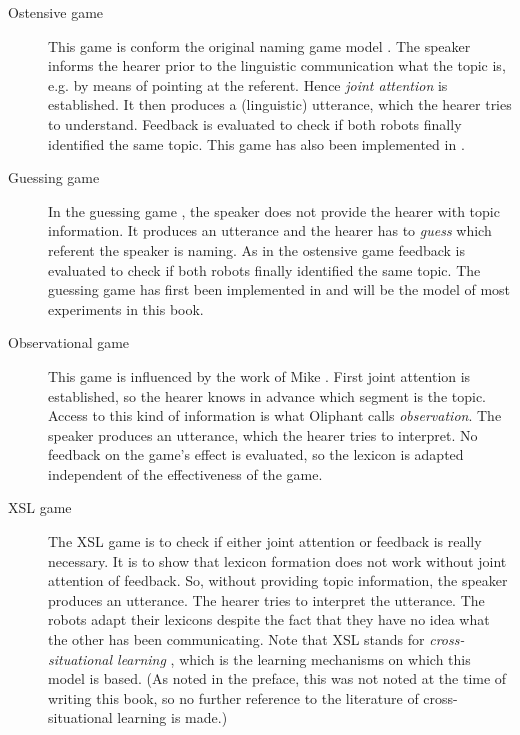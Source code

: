 \begin{description}
\item[Ostensive game] This game is conform the original naming game model \citep{steels:1996a}. The speaker informs the hearer prior to the linguistic communication what the topic is, e.g. by means of pointing at the referent. Hence {\em joint attention} is established. It then produces a (linguistic) utterance, which the hearer tries to understand. Feedback is evaluated to check if both robots finally identified the same topic. This game has also been implemented in \citet{steelsvogt:1997}.

\item[Guessing game] In the guessing game \citep{steelskaplan:1999}, the speaker does not provide the hearer with topic information. It produces an utterance and the hearer has to {\em guess} which referent the speaker is naming. As in the ostensive game feedback is evaluated to check if both robots finally identified the same topic. The guessing game has first been implemented in \citealt{vogt:1998c} and will be the model of most experiments in this book.

\item[Observational game] This game is influenced by the work of Mike \citet{oliphant:1997}. First joint attention is established, so the hearer knows in advance which segment is the topic. Access to this kind of information is what Oliphant calls {\em observation}. The speaker produces an utterance, which the hearer tries to interpret. No feedback on the game's effect is evaluated, so the lexicon is adapted independent of the effectiveness of the game.

\item[XSL game] The XSL game is to check if either joint attention or feedback is really necessary. It is to show that lexicon formation does not work without joint attention of feedback. So, without providing topic information, the speaker produces an utterance. The hearer tries to interpret the utterance. The robots adapt their lexicons despite the fact that they have no idea what the other has been communicating. Note that XSL stands for {\em cross-situational learning} \citep{pinker:1989,siskind:1996}, which is the learning mechanisms on which this model is based. (As noted in the preface, this was not noted at the time of writing this book, so no further reference to the literature of cross-situational learning is made.)

\end{description}

